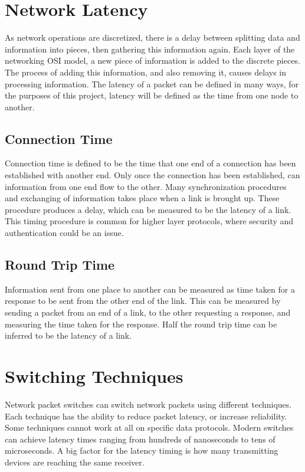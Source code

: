\section{Network Latency}

\par As network operations are discretized, there is a delay between splitting data and information into pieces, then gathering this information again.
Each layer of the networking OSI model, a new piece of information is added to the discrete pieces.
The process of adding this information, and also removing it, causes delays in processing information.
The latency of a packet can be defined in many ways, for the purposes of this project, latency will be defined as the time from one node to another.

\subsection{Connection Time}

\par Connection time is defined to be the time that one end of a connection has been established with another end.
Only once the connection has been established, can information from one end flow to the other.
Many synchronization procedures and exchanging of information takes place when a link is brought up.
These procedure produces a delay, which can be measured to be the latency of a link.
This timing procedure is common for higher layer protocols, where security and authentication could be an issue.

\subsection{Round Trip Time}

\par Information sent from one place to another can be measured as time taken for a response to be sent from the other end of the link.
This can be measured by sending a packet from an end of a link, to the other requesting a response, and measuring the time taken for the response.
Half the round trip time can be inferred to be the latency of a link.

\section{Switching Techniques}

\par Network packet switches can switch network packets using different techniques.
Each technique has the ability to reduce packet latency, or increase reliability. 
Some techniques cannot work at all on specific data protocols.
Modern switches can achieve latency times ranging from hundreds of nanoseconds to tens of microseconds.
A big factor for the latency timing is how many transmitting devices are reaching the same receiver.

